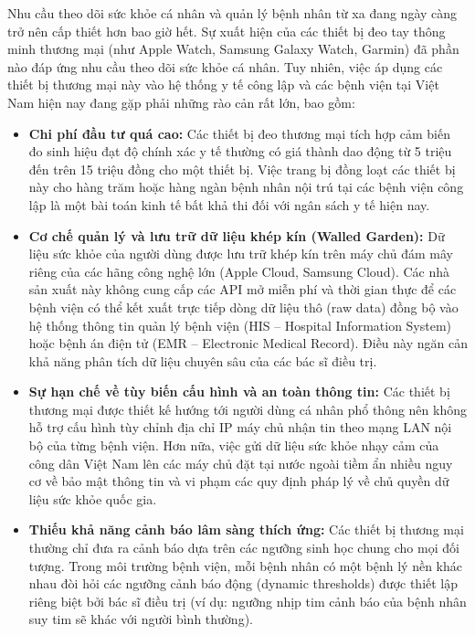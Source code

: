 Nhu cầu theo dõi sức khỏe cá nhân và quản lý bệnh nhân từ xa đang ngày càng trở nên cấp thiết hơn bao giờ hết. Sự xuất hiện của các thiết bị đeo tay thông minh thương mại (như Apple Watch, Samsung Galaxy Watch, Garmin) đã phần nào đáp ứng nhu cầu theo dõi sức khỏe cá nhân. Tuy nhiên, việc áp dụng các thiết bị thương mại này vào hệ thống y tế công lập và các bệnh viện tại Việt Nam hiện nay đang gặp phải những rào cản rất lớn, bao gồm:
\begin{itemize}
    \item \textbf{Chi phí đầu tư quá cao:} Các thiết bị đeo thương mại tích hợp cảm biến đo sinh hiệu đạt độ chính xác y tế thường có giá thành dao động từ 5 triệu đến trên 15 triệu đồng cho một thiết bị. Việc trang bị đồng loạt các thiết bị này cho hàng trăm hoặc hàng ngàn bệnh nhân nội trú tại các bệnh viện công lập là một bài toán kinh tế bất khả thi đối với ngân sách y tế hiện nay.
    \item \textbf{Cơ chế quản lý và lưu trữ dữ liệu khép kín (Walled Garden):} Dữ liệu sức khỏe của người dùng được lưu trữ khép kín trên máy chủ đám mây riêng của các hãng công nghệ lớn (Apple Cloud, Samsung Cloud). Các nhà sản xuất này không cung cấp các API mở miễn phí và thời gian thực để các bệnh viện có thể kết xuất trực tiếp dòng dữ liệu thô (raw data) đồng bộ vào hệ thống thông tin quản lý bệnh viện (HIS -- Hospital Information System) hoặc bệnh án điện tử (EMR -- Electronic Medical Record). Điều này ngăn cản khả năng phân tích dữ liệu chuyên sâu của các bác sĩ điều trị.
    \item \textbf{Sự hạn chế về tùy biến cấu hình và an toàn thông tin:} Các thiết bị thương mại được thiết kế hướng tới người dùng cá nhân phổ thông nên không hỗ trợ cấu hình tùy chỉnh địa chỉ IP máy chủ nhận tin theo mạng LAN nội bộ của từng bệnh viện. Hơn nữa, việc gửi dữ liệu sức khỏe nhạy cảm của công dân Việt Nam lên các máy chủ đặt tại nước ngoài tiềm ẩn nhiều nguy cơ về bảo mật thông tin và vi phạm các quy định pháp lý về chủ quyền dữ liệu sức khỏe quốc gia.
    \item \textbf{Thiếu khả năng cảnh báo lâm sàng thích ứng:} Các thiết bị thương mại thường chỉ đưa ra cảnh báo dựa trên các ngưỡng sinh học chung cho mọi đối tượng. Trong môi trường bệnh viện, mỗi bệnh nhân có một bệnh lý nền khác nhau đòi hỏi các ngưỡng cảnh báo động (dynamic thresholds) được thiết lập riêng biệt bởi bác sĩ điều trị (ví dụ: ngưỡng nhịp tim cảnh báo của bệnh nhân suy tim sẽ khác với người bình thường).
\end{itemize}

